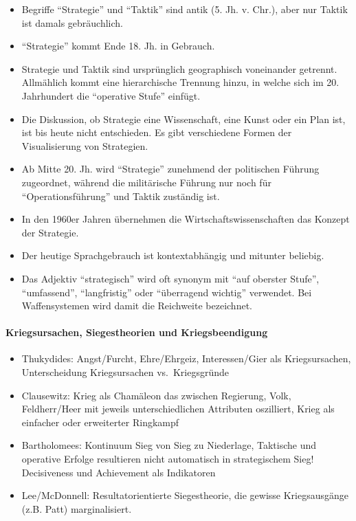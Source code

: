 {}\documentclass[a4paper]{article}
\providecommand{\tightlist}{\setlength{\itemsep}{1mm}\setlength{\parskip}{1mm}}
\begin{document}
\begin{itemize}
	\tightlist
	\item
	      Begriffe ``Strategie'' und ``Taktik'' sind antik (5. Jh. v. Chr.),
	      aber nur Taktik ist damals gebräuchlich.
	\item
	      ``Strategie'' kommt Ende 18. Jh. in Gebrauch.
	\item
	      Strategie und Taktik sind ursprünglich geographisch voneinander
	      getrennt. Allmählich kommt eine hierarchische Trennung hinzu, in
	      welche sich im 20. Jahrhundert die ``operative Stufe'' einfügt.
	\item
	      Die Diskussion, ob Strategie eine Wissenschaft, eine Kunst oder ein
	      Plan ist, ist bis heute nicht entschieden. Es gibt verschiedene Formen
	      der Visualisierung von Strategien.
	\item
	      Ab Mitte 20. Jh. wird ``Strategie'' zunehmend der politischen Führung
	      zugeordnet, während die militärische Führung nur noch für
	      ``Operationsführung'' und Taktik zuständig ist.
	\item
	      In den 1960er Jahren übernehmen die Wirtschaftswissenschaften das
	      Konzept der Strategie.
	\item
	      Der heutige Sprachgebrauch ist kontextabhängig und mitunter beliebig.
	\item
	      Das Adjektiv ``strategisch'' wird oft synonym mit ``auf oberster
	      Stufe'', ``umfassend'', ``langfristig'' oder ``überragend wichtig''
	      verwendet. Bei Waffensystemen wird damit die Reichweite bezeichnet.
\end{itemize}

\paragraph{Kriegsursachen, Siegestheorien und
	Kriegsbeendigung}\label{kriegsursachen-siegestheorien-und-kriegsbeendigung}

\begin{itemize}
	\tightlist
	\item
	      Thukydides: Angst/Furcht, Ehre/Ehrgeiz, Interessen/Gier als
	      Kriegsursachen, Unterscheidung Kriegsursachen vs.~Kriegsgründe
	\item
	      Clausewitz: Krieg als Chamäleon das zwischen Regierung, Volk,
	      Feldherr/Heer mit jeweils unterschiedlichen Attributen oszilliert,
	      Krieg als einfacher oder erweiterter Ringkampf
	\item
	      Bartholomees: Kontinuum Sieg von Sieg zu Niederlage, Taktische und
	      operative Erfolge resultieren nicht automatisch in strategischem Sieg!
	      Decisiveness und Achievement als Indikatoren
	\item
	      Lee/McDonnell: Resultatorientierte Siegestheorie, die gewisse
	      Kriegsausgänge (z.B. Patt) marginalisiert.
\end{itemize}
\end{document}
